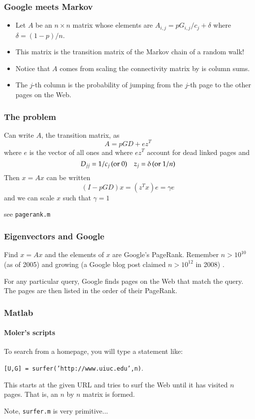 \documentclass[10pt]{beamer}
\begin{document}
\begin{frame}
\frametitle{Google meets Markov}
\begin{itemize}
\item Let $A$ be an $n \times n$ matrix whose elements are
$A_{i,j}
= p G_{i,j}/c_j + \delta$ where $\delta = (1-p)/n$.
\item This matrix is the transition matrix of the Markov chain of
a random walk!
\item Notice that $A$ comes from scaling the connectivity matrix
by is column sums.
\item The $j$-th column is the probability of jumping from the
$j$-th page to the other pages on the Web.
\end{itemize}
\end{frame}
\begin{frame}
    \frametitle{The problem}
Can write $A$, the transition matrix, as
\[
A = p G D + e z^T
\]
where $e$ is the vector of all ones and where $ez^T$ account for dead linked 
pages and 
\[
D_{jj} = 1/c_j \,\textnormal{(or 0)}\quad z_j = \delta\, \textnormal{(or $1/n$)}
\]
Then $x=Ax$ can be written
\[
 (I-pGD)x = (z^Tx) e = \gamma e
\]
and we can scale $x$ such that $\gamma=1$

see \texttt{pagerank.m}
\end{frame}
\begin{frame}
\frametitle{Eigenvectors and Google}

Find $x = Ax$ and the elements of $x$ are Google's PageRank.
Remember $n > 10^{10}$ (as of 2005) and growing (a Google blog post
claimed $n > 10^{12}$ in 2008) .
\bigskip
\bigskip

For any particular query, Google finds pages on the Web that match
the query.  The pages are then listed in the order of their
PageRank.
\end{frame}
\begin{frame}
\frametitle{Matlab}
\framesubtitle{Moler's scripts}
To search from a homepage, you will type a statement like:
\bigskip

\texttt{[U,G] = surfer('http://www.uiuc.edu',n)}.
\bigskip

This starts at the given URL and tries to surf the Web until it
has visited $n$ pages.  That is, an $n$ by $n$ matrix is formed.
\bigskip

Note, \texttt{surfer.m} is very primitive...
\end{frame}
\end{document}
